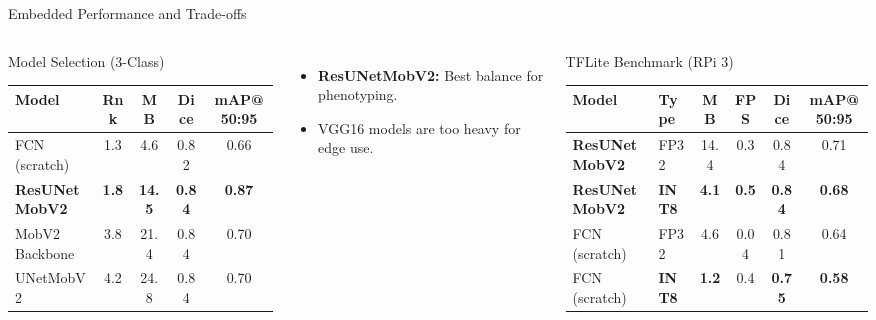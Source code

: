 \documentclass[aspectratio=169]{beamer}
\begin{document}
\begin{frame}{Embedded Performance and Trade-offs}
    \begin{columns}[T, onlytextwidth]
        \begin{block}{Model Selection (3-Class)}
            \centering
            \tiny
            \begin{tabular}{l c c c c}
                \toprule
                \textbf{Model} & \textbf{Rnk} & \textbf{MB} & \textbf{Dice} & \textbf{mAP@50:95} \\
                \midrule
                FCN (scratch) & 1.3 & 4.6 & 0.82 & 0.66 \\
                \textbf{ResUNetMobV2} & \textbf{1.8} & \textbf{14.5} & \textbf{0.84} & \textbf{0.87} \\
                MobV2 Backbone & 3.8 & 21.4 & 0.84 & 0.70 \\
                UNetMobV2 & 4.2 & 24.8 & 0.84 & 0.70 \\
                \bottomrule
            \end{tabular}
        \end{block}
        
        \vspace{-0.5em}
        \begin{itemize}
            \tiny
            \item \textbf{ResUNetMobV2:} Best balance for phenotyping.
            \item VGG16 models are too heavy for edge use.
        \end{itemize}

        \begin{exampleblock}{TFLite Benchmark (RPi 3)}
            \centering
            \tiny
            \begin{tabular}{l l c c c c}
                \toprule
                \textbf{Model} & \textbf{Type} & \textbf{MB} & \textbf{FPS} & \textbf{Dice} & \textbf{mAP@50:95} \\
                \midrule
                \textbf{ResUNetMobV2} & FP32 & 14.4 & 0.3 & 0.84 & 0.71 \\
                \textbf{ResUNetMobV2} & \textbf{INT8} & \textbf{4.1} & \textbf{0.5} & \textbf{0.84} & \textbf{0.68} \\
                \midrule
                FCN (scratch) & FP32 & 4.6 & 0.04 & 0.81 & 0.64 \\
                FCN (scratch) & \textbf{INT8} & \textbf{1.2} & 0.4 & \textbf{0.75} & \textbf{0.58} \\
                \bottomrule
            \end{tabular}
        \end{exampleblock}
        

\end{columns}
\end{frame}
\end{document}
